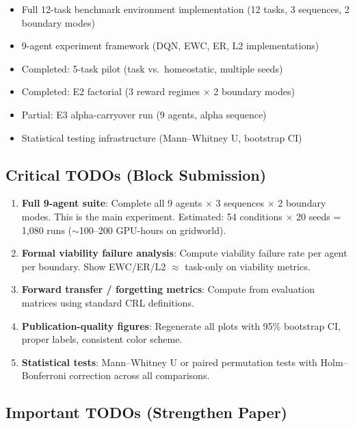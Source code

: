 \documentclass{article}
\begin{document}
\begin{itemize}[leftmargin=*]
  \item Full 12-task benchmark environment implementation (12 tasks,
        3 sequences, 2 boundary modes)
  \item 9-agent experiment framework (DQN, EWC, ER, L2 implementations)
  \item Completed: 5-task pilot (task vs.\ homeostatic, multiple seeds)
  \item Completed: E2 factorial (3 reward regimes $\times$ 2 boundary modes)
  \item Partial: E3 alpha-carryover run (9 agents, alpha sequence)
  \item Statistical testing infrastructure (Mann--Whitney U, bootstrap CI)
\end{itemize}

\subsection*{Critical TODOs (Block Submission)}

\begin{enumerate}[leftmargin=*]
  \item \textbf{Full 9-agent suite}: Complete all 9 agents $\times$
        3 sequences $\times$ 2 boundary modes. This is the main experiment.
        Estimated: 54 conditions $\times$ 20 seeds = 1,080 runs
        ($\sim$100--200 GPU-hours on gridworld).
  \item \textbf{Formal viability failure analysis}: Compute viability
        failure rate per agent per boundary. Show EWC/ER/L2 $\approx$
        task-only on viability metrics.
  \item \textbf{Forward transfer / forgetting metrics}: Compute from
        evaluation matrices using standard CRL definitions.
  \item \textbf{Publication-quality figures}: Regenerate all plots with
        95\% bootstrap CI, proper labels, consistent color scheme.
  \item \textbf{Statistical tests}: Mann--Whitney U or paired permutation
        tests with Holm--Bonferroni correction across all comparisons.
\end{enumerate}

\subsection*{Important TODOs (Strengthen Paper)}
\end{document}
